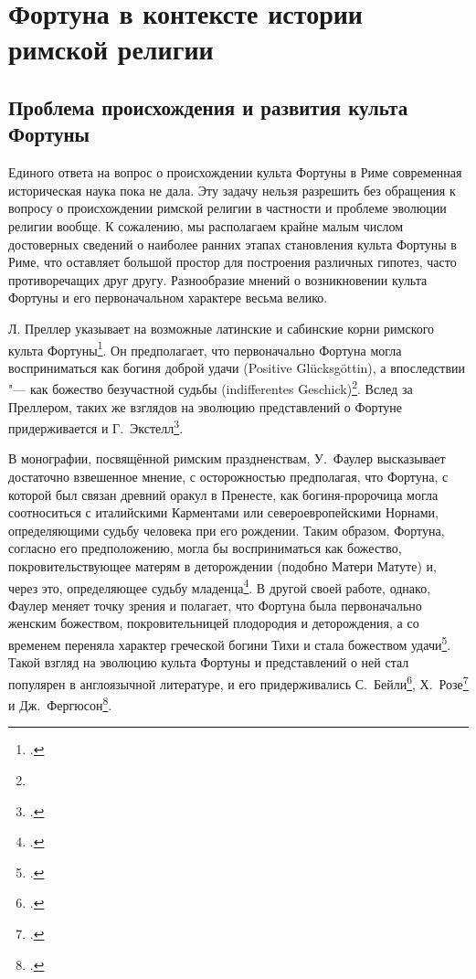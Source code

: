 \chapter{Фортуна в контексте истории римской религии}

\section{Проблема происхождения и развития культа Фортуны}

Единого ответа на вопрос о происхождении культа Фортуны в Риме современная историческая наука пока не дала. Эту задачу нельзя разрешить без обращения к вопросу о происхождении римской религии в частности и проблеме эволюции религии вообще. К сожалению, мы располагаем крайне малым числом достоверных сведений о наиболее ранних этапах становления культа Фортуны в Риме, что оставляет большой простор для построения различных гипотез, часто противоречащих друг другу. Разнообразие мнений о возникновении культа Фортуны и его первоначальном характере весьма велико.

Л. Преллер указывает на возможные латинские и сабинские корни римского культа Фортуны\footcite[S. 179]{Preller1883}. Он предполагает, что первоначально Фортуна могла восприниматься как богиня доброй удачи (Positive Gl\"{u}cksg\"{o}ttin), а впоследствии "--- как божество безучастной судьбы (indifferentes Geschick)\footnote{}. Вслед за Преллером, таких же взглядов на эволюцию представлений о Фортуне придерживается и Г.~Экстелл\footcite[Pp. 9--10]{Axtell1907}.

В монографии, посвящённой римским праздненствам, У.~Фаулер высказывает достаточно взвешенное мнение, с осторожностью предполагая, что Фортуна, с которой был связан древний оракул в Пренесте, как богиня-пророчица могла соотноситься с италийскими Карментами или североевропейскими Норнами, определяющими судьбу человека при его рождении. Таким образом, Фортуна, согласно его предположению, могла бы восприниматься как божество, покровительствующее матерям в деторождении (подобно Матери Матуте) и, через это, определяющее судьбу младенца\footcite[P. 167]{Fowler1899}. В другой своей работе, однако, Фаулер меняет точку зрения и полагает, что Фортуна была первоначально женским божеством, покровительницей плодородия и деторождения, а со временем переняла характер греческой богини Тихи и стала божеством удачи\footcite[P. 235]{Fowler1911}. Такой взгляд на эволюцию культа Фортуны и представлений о ней стал популярен в англоязычной литературе, и его придерживались С.~Бейли\footcite[P. 137]{Bailey1932}, Х.~Розе\footcite[P. 238]{Rose1959} и Дж.~Фергюсон\footcite[P. 85]{Ferguson1970}.

